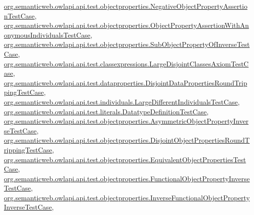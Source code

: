 \hyperlink{classorg_1_1semanticweb_1_1owlapi_1_1api_1_1test_1_1objectproperties_1_1_negative_object_property_assertion_test_case_aed3267479d16ae84d0f8a73faf336c2a}{org.\-semanticweb.\-owlapi.\-api.\-test.\-objectproperties.\-Negative\-Object\-Property\-Assertion\-Test\-Case}, \hyperlink{classorg_1_1semanticweb_1_1owlapi_1_1api_1_1test_1_1objectproperties_1_1_object_property_assertifae0c5126ce01c483d2a76c42e79dfcf_a10c1a0ec196c0a02b2bbe42ae3a61461}{org.\-semanticweb.\-owlapi.\-api.\-test.\-objectproperties.\-Object\-Property\-Assertion\-With\-Anonymous\-Individuals\-Test\-Case}, \hyperlink{classorg_1_1semanticweb_1_1owlapi_1_1api_1_1test_1_1objectproperties_1_1_sub_object_property_of_inverse_test_case_ab7159392eb9c44f755c12aff74bcbdb6}{org.\-semanticweb.\-owlapi.\-api.\-test.\-objectproperties.\-Sub\-Object\-Property\-Of\-Inverse\-Test\-Case}, \hyperlink{classorg_1_1semanticweb_1_1owlapi_1_1api_1_1test_1_1classexpressions_1_1_large_disjoint_classes_axiom_test_case_a3156e879e32a571b015e763d90fa3afb}{org.\-semanticweb.\-owlapi.\-api.\-test.\-classexpressions.\-Large\-Disjoint\-Classes\-Axiom\-Test\-Case}, \hyperlink{classorg_1_1semanticweb_1_1owlapi_1_1api_1_1test_1_1dataproperties_1_1_disjoint_data_properties_round_tripping_test_case_adea2848ddd6aed926bcc5a9cb2c3e6ad}{org.\-semanticweb.\-owlapi.\-api.\-test.\-dataproperties.\-Disjoint\-Data\-Properties\-Round\-Tripping\-Test\-Case}, \hyperlink{classorg_1_1semanticweb_1_1owlapi_1_1api_1_1test_1_1individuals_1_1_large_different_individuals_test_case_a036b4af6cb7579660301df8974c0a451}{org.\-semanticweb.\-owlapi.\-api.\-test.\-individuals.\-Large\-Different\-Individuals\-Test\-Case}, \hyperlink{classorg_1_1semanticweb_1_1owlapi_1_1api_1_1test_1_1literals_1_1_datatype_definition_test_case_a8f29a918375b023f67e89013754ce94d}{org.\-semanticweb.\-owlapi.\-api.\-test.\-literals.\-Datatype\-Definition\-Test\-Case}, \hyperlink{classorg_1_1semanticweb_1_1owlapi_1_1api_1_1test_1_1objectproperties_1_1_asymmetric_object_property_inverse_test_case_a0fe335bce09aeaa2162bdf473332f3bc}{org.\-semanticweb.\-owlapi.\-api.\-test.\-objectproperties.\-Asymmetric\-Object\-Property\-Inverse\-Test\-Case}, \hyperlink{classorg_1_1semanticweb_1_1owlapi_1_1api_1_1test_1_1objectproperties_1_1_disjoint_object_properties_round_tripping_test_case_af5305e018eb43e4d9130b8a8d8699b89}{org.\-semanticweb.\-owlapi.\-api.\-test.\-objectproperties.\-Disjoint\-Object\-Properties\-Round\-Tripping\-Test\-Case}, \hyperlink{classorg_1_1semanticweb_1_1owlapi_1_1api_1_1test_1_1objectproperties_1_1_equivalent_object_properties_test_case_a385a1b8e553350043f0bf74769ac7ea7}{org.\-semanticweb.\-owlapi.\-api.\-test.\-objectproperties.\-Equivalent\-Object\-Properties\-Test\-Case}, \hyperlink{classorg_1_1semanticweb_1_1owlapi_1_1api_1_1test_1_1objectproperties_1_1_functional_object_property_inverse_test_case_aed43c32b6127950d43934817c94f6c85}{org.\-semanticweb.\-owlapi.\-api.\-test.\-objectproperties.\-Functional\-Object\-Property\-Inverse\-Test\-Case}, \hyperlink{classorg_1_1semanticweb_1_1owlapi_1_1api_1_1test_1_1objectproperties_1_1_inverse_functional_object_property_inverse_test_case_aa1f8833f4d6aec7616f2b68d0e84edc9}{org.\-semanticweb.\-owlapi.\-api.\-test.\-objectproperties.\-Inverse\-Functional\-Object\-Property\-Inverse\-Test\-Case}, 